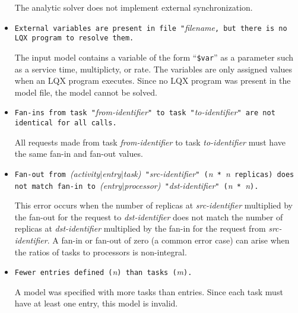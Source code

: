 \begin{itemize}
  The analytic solver does not implement external synchronization.

\item \texttt{External variables are present in file "}\emph{filename}\texttt{, but there is no LQX program
    to resolve them.}
  
  The input model contains a variable of the form ``\texttt{\$var}'' as a
  parameter such as a service time, multiplicty, or rate.  The variables are only assigned values when an
  LQX program executes.  Since no LQX program was present in the model file, the
  model cannot be solved.

\item \texttt{Fan-ins from task "}\emph{from-identifier}\texttt{" to
    task "}\emph{to-identifier}\texttt{" are not identical for all
    calls.}
  
  All requests made from task
  \emph{from-identifier} to task \emph{to-identifier} must have the
  same fan-in and fan-out values.

\item \texttt{Fan-out from }\emph{(activity$|$entry$|$task)}\texttt{
    "}\emph{src-identifier}\texttt{" (}\emph{n}\texttt{ *
  }\emph{n}\texttt{ replicas) does not match fan-in to
  }\emph{(entry$|$processor)}\texttt{ "}\emph{dst-identifier}\texttt{"
    (}\emph{n}\texttt{ * }\emph{n}\texttt{).}
  
  This error occurs when the number of replicas
  at \emph{src-identifier} multiplied by the
  fan-out for the request to \emph{dst-identifier}
  does not match the number of replicas at \emph{dst-identifier}
  multiplied by the fan-in for the request from
  \emph{src-identifier}. A fan-in or fan-out of zero (a common error
  case) can arise when the ratios of tasks to processors is
  non-integral.

\item \texttt{Fewer entries defined (}\emph{n}\texttt{) than tasks
    (}\emph{m}\texttt{).}
  
  A model was specified with more tasks than entries.  Since each task
  must have at least one entry, this model is
  invalid.


\end{itemize}
